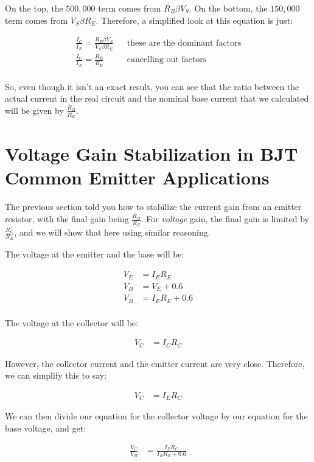 On the top, the $500,000$ term comes from $R_B \beta V_S$.
On the bottom, the $150,000$ term comes from $V_S \beta R_E$.
Therefore, a simplified look at this equation is just:

\begin{align*}
\frac{I_C}{I_N} = \frac{R_B \beta V_S}{V_S \beta R_E} && \textrm{these are the dominant factors} \\
\frac{I_C}{I_N} = \frac{R_B}{R_E} && \textrm{cancelling out factors} \\
\end{align*}

So, even though it isn't an exact result, you can see that the ratio between the actual current in the real circuit and the nominal base current that we calculated will be given by $\frac{R_B}{R_E}$.
\fi

\section{Voltage Gain Stabilization in BJT Common Emitter Applications}
\label{apTransistorVoltageGain}

The previous section told you how to stabilize the current gain from an emitter resistor, with the final gain being $\frac{R_B}{R_E}$.
For \emph{voltage} gain, the final gain is limited by $\frac{R_C}{R_E}$, and we will show that here using similar reasoning.

The voltage at the emitter and the base will be:

\begin{align*}
V_E &= I_E R_E \\
V_B &= V_E + 0.6 \\
V_B &= I_E R_E + 0.6 \\
\end{align*}

The voltage at the collector will be:

\begin{align*}
V_C &= I_C R_C
\end{align*}

However, the collector current and the emitter current are very close.
Therefore, we can simplify this to say:

\begin{align*}
V_C &= I_E R_C
\end{align*}

We can then divide our equation for the collector voltage by our equation for the base voltage, and get:

\begin{align*}
\frac{V_C}{V_B} &= \frac{I_E R_C}{I_E R_E + 0.6}
\end{align*}

